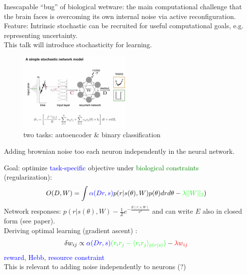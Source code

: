 \documentclass[12pt]{article}
\begin{document}
Inescapable ``bug'' of biological wetware: the main computational challenge that the brain faces is overcoming its own internal noise via active reconfiguration. \\

Feature: Intrinsic stochastic can be recruited for useful computational goals, e.g. representing uncertainty.  \\

This talk will introduce stochasticity for learning. 
\begin{figure}
  \centering
      \includegraphics[width=0.5\textwidth]{images/stochnn.png}
  \caption{two tasks: autoencoder \& binary classification}
\end{figure}

Adding brownian noise too each neuron independently in the neural network.

Goal: optimize \textcolor{blue}{task-specific} objective under \textcolor{green}{biological constraints} (regularization):
$$
O(D,W) = \int \textcolor{blue}{\alpha(Dr, s)}p(r|s(\theta),W)p(\theta)drd\theta - \textcolor{green}{\lambda ||W||_2})
$$
Network responses: $p(r|s(\theta),W) - \frac{1}{Z}e^{-\frac{E(r;s,W)}{\sigma^2}}$ and can write $E$ also in closed form (see paper). \\

Deriving optimal learning (gradient ascent) \cite{Williams1992, Fiete2006, Fiete2007, Scellier16, Miconi2017}:
$$
\delta w_{ij} \propto \textcolor{blue}{\alpha(Dr,s)}\textcolor{green}{(r_ir_j - \langle r_ir_j \rangle_{p(r|s)})} - \textcolor{red}{\lambda w_{ij}}
$$
\textcolor{blue}{reward}, \textcolor{blue}{Hebb}, \textcolor{blue}{resource constraint} \\

This is relevant to adding noise independently to neurons (?) \\
\end{document}
